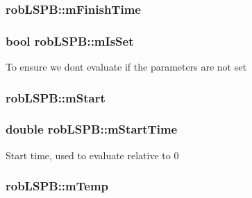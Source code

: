 \subsubsection[{m\+Finish\+Time}]{ rob\+L\+S\+P\+B\+::m\+Finish\+Time\hspace{0.3cm}{\ttfamily [protected]}}\label{classrob_l_s_p_b_aa1e0ff251a01dca4a598caa294e2166d}
\hypertarget{classrob_l_s_p_b_a754306ed9e75319fdd5752dc564b1b85}{}
\subsubsection[{m\+Is\+Set}]{\setlength{\rightskip}{0pt plus 5cm}bool rob\+L\+S\+P\+B\+::m\+Is\+Set\hspace{0.3cm}{\ttfamily [protected]}}\label{classrob_l_s_p_b_a754306ed9e75319fdd5752dc564b1b85}
To ensure we don\textquotesingle{}t evaluate if the parameters are not set \hypertarget{classrob_l_s_p_b_ab1ad2d98754f2e0461f7853997293ea5}{}
\subsubsection[{m\+Start}]{ rob\+L\+S\+P\+B\+::m\+Start\hspace{0.3cm}{\ttfamily [protected]}}\label{classrob_l_s_p_b_ab1ad2d98754f2e0461f7853997293ea5}
\hypertarget{classrob_l_s_p_b_a8116b0fac995bf253c0f701c7ab7a00b}{}
\subsubsection[{m\+Start\+Time}]{\setlength{\rightskip}{0pt plus 5cm}double rob\+L\+S\+P\+B\+::m\+Start\+Time\hspace{0.3cm}{\ttfamily [protected]}}\label{classrob_l_s_p_b_a8116b0fac995bf253c0f701c7ab7a00b}
Start time, used to evaluate relative to 0 \hypertarget{classrob_l_s_p_b_a5fdcfe010bf035e87654f2cd15e07d96}{}
\subsubsection[{m\+Temp}]{ rob\+L\+S\+P\+B\+::m\+Temp\hspace{0.3cm}{\ttfamily [protected]}}\label{classrob_l_s_p_b_a5fdcfe010bf035e87654f2cd15e07d96}
\hypertarget{classrob_l_s_p_b_aa239e468d4cd7628eda3dd9a799c1742}{}
